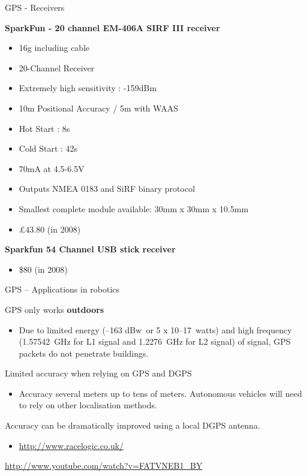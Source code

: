 \documentclass[compress]{beamer}
\providecommand{\tightlist}{%
  \setlength{\itemsep}{0pt}\setlength{\parskip}{0pt}}
\begin{document}
\begin{frame}{GPS - Receivers}

\textbf{SparkFun - 20 channel EM-406A SIRF III receiver}

\begin{itemize}
\tightlist
\item
  16g including cable
\item
  20-Channel Receiver
\item
  Extremely high sensitivity : -159dBm
\item
  10m Positional Accuracy / 5m with WAAS
\item
  Hot Start : 8s
\item
  Cold Start : 42s
\item
  70mA at 4.5-6.5V
\item
  Outputs NMEA 0183 and SiRF binary protocol
\item
  Smallest complete module available: 30mm x 30mm x 10.5mm
\item
  £43.80 (in 2008)
\end{itemize}

\textbf{Sparkfun 54 Channel USB stick receiver}

\begin{itemize}
\tightlist
\item
  \$80 (in 2008)
\end{itemize}

\end{frame}

\begin{frame}{GPS -- Applications in robotics}

GPS only works \textbf{outdoors}

\begin{itemize}
\tightlist
\item
  Due to limited energy (--163 dBw~or 5 x 10--17~watts) and high
  frequency (1.57542~GHz for L1 signal and 1.2276~GHz for L2 signal) of
  signal, GPS packets do not penetrate buildings.
\end{itemize}

Limited accuracy when relying on GPS and DGPS

\begin{itemize}
\tightlist
\item
  Accuracy several meters up to tens of meters. Autonomous vehicles will
  need to rely on other localisation methods.
\end{itemize}

Accuracy can be dramatically improved using a local DGPS antenna.

\begin{itemize}
\tightlist
\item
  \url{http://www.racelogic.co.uk/}
\end{itemize}

\url{http://www.youtube.com/watch?v=FATVNEB1_BY}

\end{frame}
\end{document}
